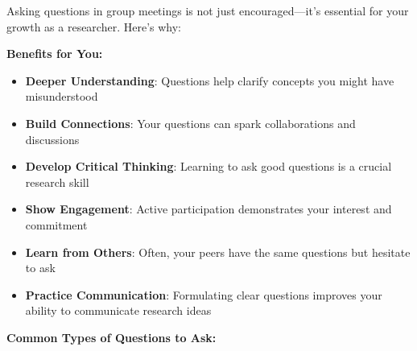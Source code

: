 \documentclass[11pt,a4paper]{article}
\begin{document}
\begin{tcolorbox}[colback=green!10,colframe=green!50,title=Why Active Participation Matters]
Asking questions in group meetings is not just encouraged—it's essential for your growth as a researcher. Here's why:

\textbf{Benefits for You:}
\begin{itemize}
    \item \textbf{Deeper Understanding}: Questions help clarify concepts you might have misunderstood
    \item \textbf{Build Connections}: Your questions can spark collaborations and discussions
    \item \textbf{Develop Critical Thinking}: Learning to ask good questions is a crucial research skill
    \item \textbf{Show Engagement}: Active participation demonstrates your interest and commitment
    \item \textbf{Learn from Others}: Often, your peers have the same questions but hesitate to ask
    \item \textbf{Practice Communication}: Formulating clear questions improves your ability to communicate research ideas
\end{itemize}
\end{tcolorbox}

\textbf{Common Types of Questions to Ask:}
\end{document}
